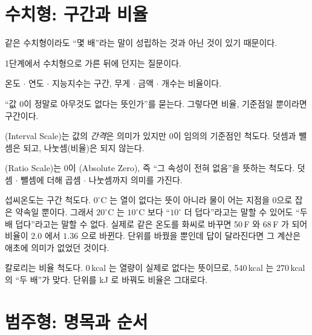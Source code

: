\section{수치형: 구간과 비율}
\label{sec:attr-numeric}

\begin{inbrief}
  \item[Why] 같은 수치형이라도 ``몇 배''라는 말이 성립하는 것과 아닌 것이 있기
             때문이다.
  \item[When] 1단계에서 수치형으로 가른 뒤에 던지는 질문이다.
  \item[Where] 온도 $\cdot$ 연도 $\cdot$ 지능지수는 구간, 무게 $\cdot$ 금액
               $\cdot$ 개수는 비율이다.
  \item[How] ``값 0이 정말로 아무것도 없다는 뜻인가''를 묻는다. 그렇다면 비율,
             기준점일 뿐이라면 구간이다.
\end{inbrief}

\begin{definition}[구간 척도와 비율 척도]
\label{def:interval-ratio}
(Interval Scale)는 값의 \emph{간격}은 의미가 있지만 0이
임의의 기준점인 척도다. 덧셈과 뺄셈은 되고, 나눗셈(비율)은 되지 않는다.

(Ratio Scale)는 0이 (Absolute Zero), 즉
``그 속성이 전혀 없음''을 뜻하는 척도다. 덧셈 $\cdot$ 뺄셈에 더해
곱셈 $\cdot$ 나눗셈까지 의미를 가진다.
\end{definition}

\begin{example}[``두 배''가 성립하는가]
\label{ex:twice}
섭씨온도는 구간 척도다. $0^\circ\mathrm{C}$ 는 열이 없다는 뜻이 아니라 물이 어는
지점을 0으로 잡은 약속일 뿐이다. 그래서 $20^\circ\mathrm{C}$ 는
$10^\circ\mathrm{C}$ 보다 ``$10^\circ$ 더 덥다''라고는 말할 수 있어도
``두 배 덥다''라고는 말할 수 없다. 실제로 같은 온도를 화씨로 바꾸면 50\,\textdegree F
와 68\,\textdegree F 가 되어 비율이 $2.0$ 에서 $1.36$ 으로 바뀐다. 단위를
바꿨을 뿐인데 답이 달라진다면 그 계산은 애초에 의미가 없었던 것이다.

칼로리는 비율 척도다. 0\,kcal 는 열량이 실제로 없다는 뜻이므로,
540\,kcal 는 270\,kcal 의 ``두 배''가 맞다. 단위를 kJ 로 바꿔도 비율은 그대로다.
\end{example}

\section{범주형: 명목과 순서}
\label{sec:attr-categorical}

